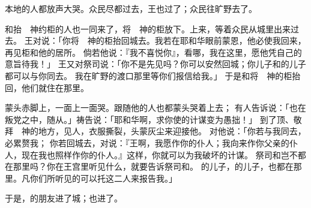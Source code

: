 {本地的人都放声大哭。众民尽都过去，王也过了{}；众民往旷野去了。
\par }{\PP {}和抬　神约柜的{}人也一同来了，将　神的{}柜放下。{}上来，等着众民从城里出来过去。
王对{}说：「你将　神的{}柜抬回城去。我若在耶和华眼前蒙恩，他必使我回来，再见{}柜和他的居所。
倘若他说：『我不喜悦你』，看哪，我在这里，愿他凭自己的意旨待我！」
王又对祭司{}说：「你不是先见吗？你可以安然回城；你儿子{}和{}的儿子{}都可以与你同去。
我在旷野的渡口那里等你们报信给我。」
于是{}和{}将　神的{}柜抬回{}，他们就住在那里。
\par }{\PP {}蒙头赤脚上{}，一面上一面哭。跟随他的人也都蒙头哭着上去；
有人告诉{}说：「{}也在叛党之中，随从{}。」{}祷告说：「耶和华啊，求你使{}的计谋变为愚拙！」
到了{}顶、敬拜　神的地方，见{}人{}，衣服撕裂，头蒙灰尘来迎接他。
对他说：「你若与我同去，必累赘我；
你若回城去，对{}说：『王啊，我愿作你的仆人；我向来作你父亲的仆人，现在我也照样作你的仆人。』这样，你就可以为我破坏{}的计谋。
祭司{}和{}岂不都在那里吗？你在王宫里听见什么，就要告诉祭司{}和{}。
的儿子{}，{}的儿子{}，也都在那里。凡你们所听见的可以托这二人来报告我。」
\par }{\PP {}于是，{}的朋友{}进了城；{}也进了{}。

}
